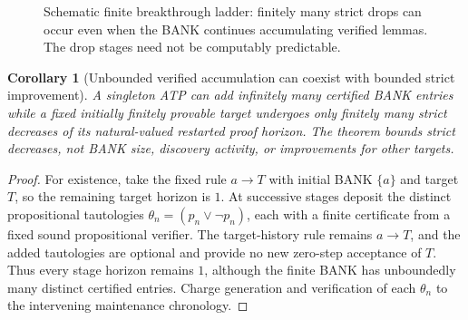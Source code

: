 \documentclass[11pt]{article}
\newtheorem{corollary}[theorem]{Corollary}
\theoremstyle{definition}
\begin{document}
\begin{figure}[ht]
\centering
{}
\caption{Schematic finite breakthrough ladder: finitely many strict drops can occur even when the BANK continues accumulating verified lemmas. The drop stages need not be computably predictable.}
\end{figure}

\begin{corollary}[Unbounded verified accumulation can coexist with bounded strict improvement]
A singleton ATP can add infinitely many certified BANK entries while a fixed initially finitely provable target undergoes only finitely many strict decreases of its natural-valued restarted proof horizon. The theorem bounds strict decreases, not BANK size, discovery activity, or improvements for other targets.
\end{corollary}
\begin{proof}
For existence, take the fixed rule $a\to T$ with initial BANK $\{a\}$ and target $T$, so the remaining target horizon is $1$. At successive stages deposit the distinct propositional tautologies $\theta_n=(p_n\lor\neg p_n)$, each with a finite certificate from a fixed sound propositional verifier. The target-history rule remains $a\to T$, and the added tautologies are optional and provide no new zero-step acceptance of $T$. Thus every stage horizon remains $1$, although the finite BANK has unboundedly many distinct certified entries. Charge generation and verification of each $\theta_n$ to the intervening maintenance chronology.
\end{proof}
\end{document}
